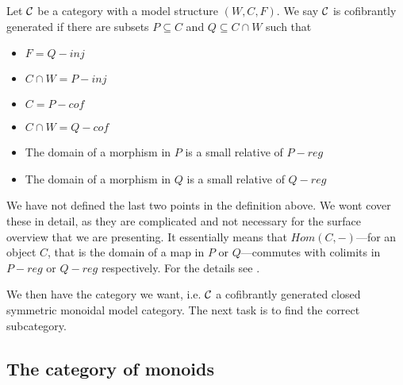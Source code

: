 \begin{definition}
Let $\mathcal{C}$ be a category with a model structure $(W, C, F)$. We say $\mathcal{C}$ is cofibrantly generated if there are subsets $P\subseteq C$ and $Q\subseteq C\cap W$ such that 
\begin{itemize}
    \item $F = Q-inj$
    \item $C\cap W = P-inj$
    \item $C = P-cof$
    \item $C\cap W = Q-cof$ 
    \item The domain of a morphism in $P$ is a small relative of $P-reg$
    \item The domain of a morphism in $Q$ is a small relative of $Q-reg$
\end{itemize}
\end{definition}

We have not defined the last two points in the definition above. We wont cover these in detail, as they are complicated and not necessary for the surface overview that we are presenting. It essentially means that $Hom(C,-)$---for an object $C$, that is the domain of a map in $P$ or $Q$---commutes with colimits in $P-reg$ or $Q-reg$ respectively. For the details see \cite{monoid}. 

We then have the category we want, i.e. $\mathcal{C}$ a cofibrantly generated closed symmetric monoidal model category. The next task is to find the correct subcategory. 





\subsection*{The category of monoids}


